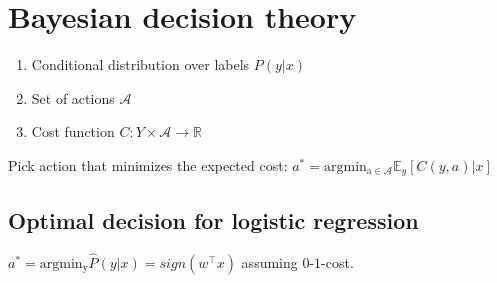 \section*{Bayesian decision theory}
\begin{enumerate}[noitemsep,leftmargin=6mm,topsep=0pt,parsep=0pt,partopsep=0pt]
	\item Conditional distribution over labels $P(y|x)$
	\item Set of actions $\mathcal{A}$
	\item Cost function $C:Y\times \mathcal{A} \rightarrow \mathbb{R}$
\end{enumerate}

Pick action that minimizes the expected cost:
$a^* = \operatorname{argmin_{a \in \mathcal{A}}} \mathbb{E}_y[C(y,a)|x]$

\subsection*{Optimal decision for logistic regression}
$a^* = \operatorname{argmin_y} \hat{P}(y|x) = sign(w^\top x)$ assuming 
$0$-$1$-cost.
\\